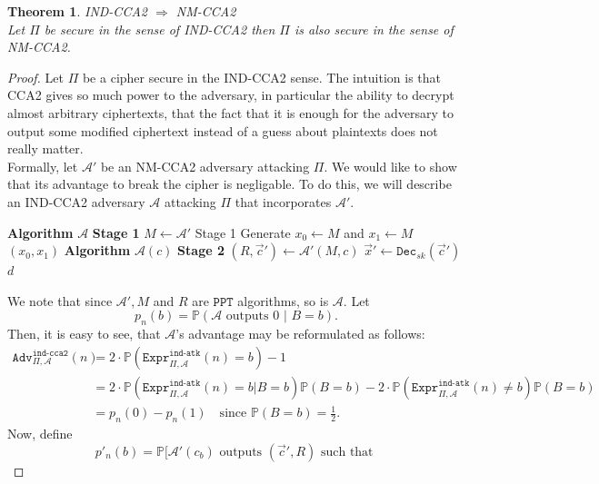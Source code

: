 \documentclass{article}
\newtheorem{theorem}{Theorem}[section]
\theoremstyle{definition}
\newcommand{\Dec}{\texttt{Dec}}
\newcommand{\A}{\mathcal{A}}
\newcommand{\Prob}{\mathbb{P}}
\newcommand{\PPT}{\texttt{PPT}}
\newcommand{\Expr}[2]{\texttt{Expr}^{\texttt{#1}}_{#2}}
\newcommand{\Adv}[2]{\texttt{Adv}^{\texttt{#1}}_{#2}}
\begin{document}
\begin{theorem}{IND-CCA2 $\Rightarrow$ NM-CCA2}\\
  Let $\Pi$ be secure in the sense of IND-CCA2 then $\Pi$ is also secure in the
  sense of NM-CCA2.
\end{theorem}
\begin{proof}
  Let $\Pi$ be a cipher secure in the IND-CCA2 sense. The intuition is that CCA2
  gives so much power to the adversary, in particular the ability to decrypt
  almost arbitrary ciphertexts, that the fact that it is enough for the
  adversary to output some modified ciphertext instead of a guess about
  plaintexts does not really matter.\\
  Formally, let $\A'$ be an NM-CCA2 adversary attacking $\Pi$. We would like to
  show that its advantage to break the cipher is negligable. To do this, we will
  describe an IND-CCA2 adversary $\A$ attacking $\Pi$ that incorporates $\A'$.\\
  \begin{algorithmic}
    \State \textbf{Algorithm} $\A$ \textbf{Stage 1}
    \State $M \leftarrow \A'$ Stage 1
    \State Generate $x_0 \leftarrow M$ and $x_1 \leftarrow M$
    \State \Return $(x_0, x_1)$
    \State
    \State \textbf{Algorithm} $\A(c)$ \textbf{Stage 2}
    \State $(R, \vec{c}') \leftarrow \A'(M, c)$
    \State $\vec{x}' \leftarrow \Dec_{sk}(\vec{c}')$
     \EndIf
    \State \Return $d$
    \State
  \end{algorithmic}
  We note that since $\A', M$ and $R$ are $\PPT$ algorithms, so is $\A$. Let
  \[
    p_n(b) = \Prob(\A \text{ outputs } 0 \,\, | \,\, B = b).
  \]
  Then, it is easy to see, that $\A$'s advantage may be reformulated as follows:
  \begin{equation}
    \begin{split}
      \label{eq:indcca2eqnmcca2}
    \Adv{ind-cca2}{\Pi, \A}(n) &= 2\cdot\Prob(\Expr{ind-atk}{\Pi, \A}(n) = b)
    - 1 \\
                               &= 2\cdot\Prob(\Expr{ind-atk}{\Pi, \A}(n) = b | B = b)\Prob(B = b)
    - 2\cdot\Prob(\Expr{ind-atk}{\Pi, \A}(n) \neq b)\Prob(B = b) \\
                               &= p_n(0) - p_n(1)\quad\text{since } \Prob(B = b) = \frac12.
     \end{split}
  \end{equation}
  Now, define
  \[
    p'_n(b) = \Prob[\A'(c_b) \text{ outputs } (\vec{c}', R) \text{ such that }
\]
\end{proof}
\end{document}
